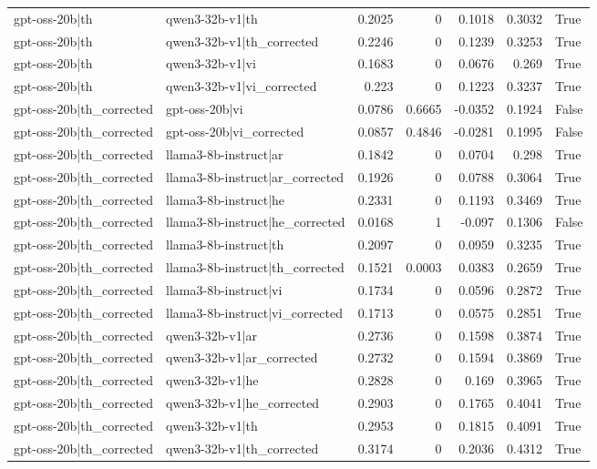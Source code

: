 \begin{table}
\begin{tabular}{l l r r r r l}
gpt-oss-20b|th & qwen3-32b-v1|th & 0.2025 & 0 & 0.1018 & 0.3032 & True \\
gpt-oss-20b|th & qwen3-32b-v1|th_corrected & 0.2246 & 0 & 0.1239 & 0.3253 & True \\
gpt-oss-20b|th & qwen3-32b-v1|vi & 0.1683 & 0 & 0.0676 & 0.269 & True \\
gpt-oss-20b|th & qwen3-32b-v1|vi_corrected & 0.223 & 0 & 0.1223 & 0.3237 & True \\
gpt-oss-20b|th_corrected & gpt-oss-20b|vi & 0.0786 & 0.6665 & -0.0352 & 0.1924 & False \\
gpt-oss-20b|th_corrected & gpt-oss-20b|vi_corrected & 0.0857 & 0.4846 & -0.0281 & 0.1995 & False \\
gpt-oss-20b|th_corrected & llama3-8b-instruct|ar & 0.1842 & 0 & 0.0704 & 0.298 & True \\
gpt-oss-20b|th_corrected & llama3-8b-instruct|ar_corrected & 0.1926 & 0 & 0.0788 & 0.3064 & True \\
gpt-oss-20b|th_corrected & llama3-8b-instruct|he & 0.2331 & 0 & 0.1193 & 0.3469 & True \\
gpt-oss-20b|th_corrected & llama3-8b-instruct|he_corrected & 0.0168 & 1 & -0.097 & 0.1306 & False \\
gpt-oss-20b|th_corrected & llama3-8b-instruct|th & 0.2097 & 0 & 0.0959 & 0.3235 & True \\
gpt-oss-20b|th_corrected & llama3-8b-instruct|th_corrected & 0.1521 & 0.0003 & 0.0383 & 0.2659 & True \\
gpt-oss-20b|th_corrected & llama3-8b-instruct|vi & 0.1734 & 0 & 0.0596 & 0.2872 & True \\
gpt-oss-20b|th_corrected & llama3-8b-instruct|vi_corrected & 0.1713 & 0 & 0.0575 & 0.2851 & True \\
gpt-oss-20b|th_corrected & qwen3-32b-v1|ar & 0.2736 & 0 & 0.1598 & 0.3874 & True \\
gpt-oss-20b|th_corrected & qwen3-32b-v1|ar_corrected & 0.2732 & 0 & 0.1594 & 0.3869 & True \\
gpt-oss-20b|th_corrected & qwen3-32b-v1|he & 0.2828 & 0 & 0.169 & 0.3965 & True \\
gpt-oss-20b|th_corrected & qwen3-32b-v1|he_corrected & 0.2903 & 0 & 0.1765 & 0.4041 & True \\
gpt-oss-20b|th_corrected & qwen3-32b-v1|th & 0.2953 & 0 & 0.1815 & 0.4091 & True \\
gpt-oss-20b|th_corrected & qwen3-32b-v1|th_corrected & 0.3174 & 0 & 0.2036 & 0.4312 & True \\

\end{tabular}
\end{table}
